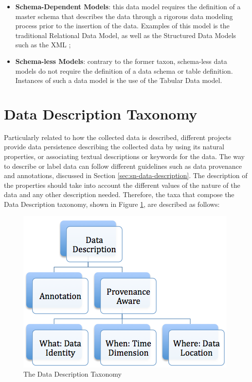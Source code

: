 \begin{itemize}
  \item \textbf{Schema-Dependent Models}: this data model requires the
  definition of a master schema that describes the data through a rigorous
  data modeling process prior to the insertion of the data. Examples of this
  model is the traditional Relational Data Model\cite{relational-model}, as
 well as the Structured Data Models such as the XML \cite{xml};
  \item \textbf{Schema-less Models}: contrary to the former taxon, schema-less
  data models do not require the definition of a data schema or table
  definition. Instances of such a data model is the use of the 
  Tabular Data model.
\end{itemize}

\section{Data Description Taxonomy}

Particularly related to how the collected data is described, different projects
provide data persistence describing the collected data by using its natural
properties, or associating textual descriptions or keywords for the data. The
way to describe or label data can follow different guidelines such as data provenance
and annotations, discussed in Section \ref{sec:sn-data-description}. The description of the
properties should take into account the different values of the nature of the
data and any other description needed. Therefore, the taxa that compose the
Data Description taxonomy, shown in Figure
\ref{fig:taxonomy-data-description}, are described as follows:

\begin{figure}[h]
  \centering
  \includegraphics[scale=0.5]{../diagrams/taxonomy-data-description}
  \caption{The Data Description Taxonomy}
  \label{fig:taxonomy-data-description}
\end{figure}

